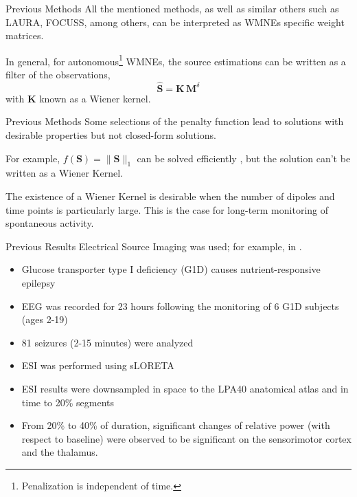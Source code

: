 \documentclass[progressbar=head]{beamer}
\newcommand{\nnorm}[1]{\lVert #1 \rVert}
\begin{document}
\begin{frame}{Previous Methods}
All the mentioned methods, as well as similar others such as LAURA\cite{LAURA},  FOCUSS\cite{focuss}, among others,
can be interpreted as WMNEs 
specific
weight matrices.

In general, for autonomous\footnote{Penalization is independent of time.} WMNEs, the source estimations can be written as a filter of the observations,
\begin{equation}
    \hat{\mathbf{S}}
    =
    \mathbf{K}\,
    \mathbf{M}^\delta
\end{equation}
with $\mathbf{K}$ known as a \alert{Wiener kernel}.
\end{frame}

\begin{frame}{Previous Methods}
Some selections of the penalty function lead to solutions with desirable properties but not closed-form solutions.

For example, $f(\mathbf{S}) = \nnorm{\mathbf{S}}_1$ can be solved efficiently \cite{review_sparse}, but the solution can't be written as a Wiener Kernel.

The existence of a Wiener Kernel is desirable when the number of dipoles and time points is particularly large. This is the case for long-term monitoring of spontaneous activity.
\end{frame}

\begin{frame}{Previous Results}
Electrical Source Imaging was used; for example, 
in
\cite{dr_pascal}.

\begin{itemize}
\item Glucose transporter type I deficiency (G1D) causes nutrient-responsive epilepsy
\item EEG was recorded for 23 hours following the monitoring
of 6 G1D subjects (ages 2-19)
\item 81 seizures (2-15 minutes) were analyzed
\item ESI was performed using sLORETA
\item ESI results were downsampled in space to the LPA40 anatomical atlas and in time to 20\% segments
\item From 20\% to 40\% of duration, significant changes of relative power (with respect to baseline) were observed to be significant on
the sensorimotor cortex and the thalamus.
\end{itemize}
\end{frame}
\end{document}
